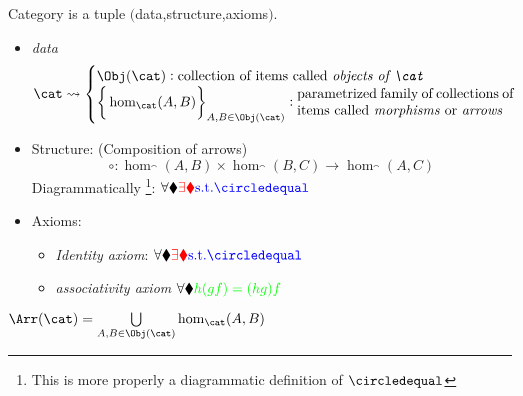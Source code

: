 \documentclass[preview]{standalone}
\begin{document}
 
\begin{definition}[Category ]
Category is a tuple $($data,structure,axioms$)$.
\begin{itemize}
\item \emph{data}
	\begin{displaymath}
		\cat \leadsto
		\begin{cases}
			\Obj(\cat) : 
			    \text{\parbox{0.65\textwidth}{ collection of items called \emph{objects of $\cat$}}}
			\\
			\biggr\lbrace \hom_{\cat} (A,B) \biggr\rbrace_{A,B \in \Obj(\cat)} : 
				\text{\parbox{0.45\textwidth}{parametrized family of collections of items  called \emph{morphisms} or \emph{arrows}}}
		\end{cases}
	\end{displaymath}

\item Structure:
	(Composition of arrows)
	\begin{displaymath}
		\circ : \hom_{\cat}(A,B) \times \hom_{\cat}(B,C) \rightarrow \hom_{\cat} (A,C)
	\end{displaymath}
	Diagrammatically \footnote{This is more properly a diagrammatic definition of  $\commute$}: 
	$\forall \bulk \textcolor{red}{\exists \bulk} \textcolor{blue}{\St \commute}$\\
\item Axioms:
	\begin{itemize}
		\item \emph{Identity axiom}:
			$\forall \bulk \textcolor{red}{\exists \bulk} \textcolor{blue}{\St \commute}$\\
		\item \emph{associativity axiom}
			$\forall \blacklozenge \textcolor{green}{h (gf) = (hg) f}$			\\
	\end{itemize}
	
\end{itemize}
\end{definition}
\begin{notation}
	$\Arr(\cat) = \bigcup\limits_{A,B \in \Obj(\cat)}\hom_{\cat} (A,B) $
\end{notation}
\end{document}
